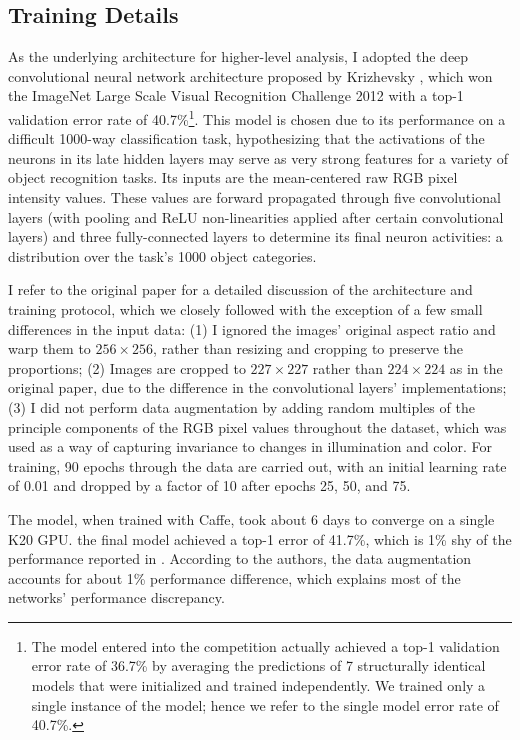 \subsection{Training Details}
As the underlying architecture for higher-level analysis, I adopted the deep convolutional neural network architecture proposed by Krizhevsky \etal \cite{krizhevsky2012imagenet}, which won the ImageNet Large Scale Visual Recognition Challenge 2012 with a top-1 validation error rate of 40.7\%\footnote{The model entered into the competition actually achieved a
top-1 validation error rate of 36.7\% by averaging the predictions
of 7 structurally identical models that were initialized and trained
independently. We trained only a single instance of the model;
hence we refer to the single model error rate of 40.7\%.
}. This model is chosen due to its performance on a difficult 1000-way classification task, hypothesizing that the activations of the neurons in its late hidden layers may serve as very strong features for a variety of object recognition tasks. Its inputs are the mean-centered raw RGB pixel intensity values. These values are forward propagated through five convolutional layers (with pooling and ReLU non-linearities applied after certain convolutional layers) and three fully-connected layers to determine its final neuron activities: a distribution over the task's 1000 object categories.

I refer to the original paper for a detailed discussion of the architecture and training protocol, which we closely followed with the exception of a few small differences in the input data: (1) I ignored the images' original aspect ratio and warp them to $256\times 256$, rather than resizing and cropping to preserve the proportions; (2) Images are cropped to $227\times 227$ rather than $224\times 224$ as in the original paper, due to the difference in the convolutional layers' implementations; (3) I did not perform data augmentation by adding random multiples of the principle components of the RGB pixel values throughout the dataset, which was used as a way of capturing invariance to changes in illumination and color. For training, 90 epochs through the data are carried out, with an initial learning rate of 0.01 and dropped by a factor of 10 after epochs 25, 50, and 75.

The model, when trained with Caffe, took about 6 days to converge on a single K20 GPU. the final model achieved a top-1 error of 41.7\%, which is 1\% shy of the performance reported in \cite{krizhevsky2012imagenet}. According to the authors, the data augmentation accounts for about 1\% performance difference, which explains most of the networks' performance discrepancy.

